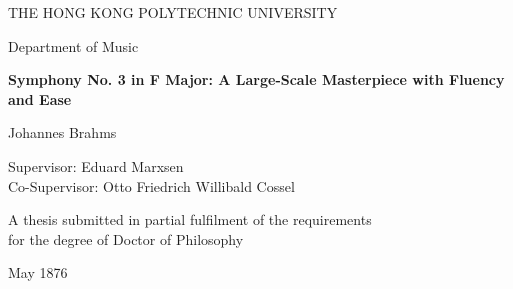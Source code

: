 \thispagestyle{empty}

\begin{center}

\vspace*{2cm} %

{\Large THE HONG KONG POLYTECHNIC UNIVERSITY}

\vspace{1cm}
{\large Department of Music}

\vspace{1cm}

\vspace{1.5cm}
{\Large \textbf{
Symphony No. 3 in F Major: A Large-Scale Masterpiece with Fluency and Ease
}}

\vspace{2cm}
{\Large Johannes Brahms}


\vspace{2.5cm}
{\large Supervisor: Eduard Marxsen} \\
{\large Co-Supervisor: Otto Friedrich Willibald Cossel}

\vspace{1.5cm}
{\large A thesis submitted in partial fulfilment of the requirements \\ for the degree of Doctor of Philosophy}

\vspace{1.5cm}
{\large May 1876}

\end{center}